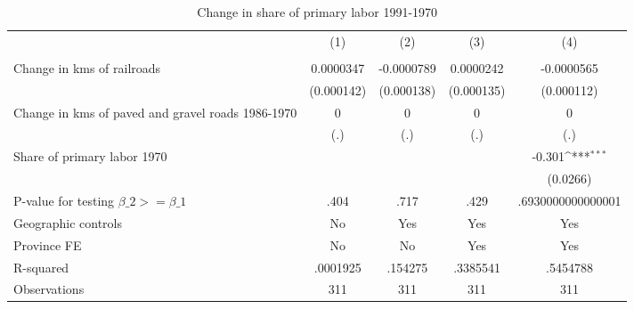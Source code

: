 \begin{table}[htbp]\centering
\def\sym#1{\ifmmode^{#1}\else\(^{#1}\)\fi}
\caption{Change in share of primary labor 1991-1970}
\begin{tabular}{l*{4}{c}}
\hline\hline
                &\multicolumn{1}{c}{(1)}&\multicolumn{1}{c}{(2)}&\multicolumn{1}{c}{(3)}&\multicolumn{1}{c}{(4)}\\
                &\multicolumn{1}{c}{}&\multicolumn{1}{c}{}&\multicolumn{1}{c}{}&\multicolumn{1}{c}{}\\
\hline
Change in kms of railroads&0.0000347         &-0.0000789         &0.0000242         &-0.0000565         \\
                &(0.000142)         &(0.000138)         &(0.000135)         &(0.000112)         \\
[1em]
Change in kms of paved and gravel roads 1986-1970&        0         &        0         &        0         &        0         \\
                &      (.)         &      (.)         &      (.)         &      (.)         \\
[1em]
Share of primary labor 1970&                  &                  &                  &   -0.301\sym{***}\\
                &                  &                  &                  & (0.0266)         \\
\hline
P-value for testing $\beta\_{2} >= \beta\_{1}$&     .404         &     .717         &     .429         &.6930000000000001         \\
Geographic controls&       No         &      Yes         &      Yes         &      Yes         \\
Province FE     &       No         &       No         &      Yes         &      Yes         \\
R-squared       & .0001925         &  .154275         & .3385541         & .5454788         \\
Observations    &      311         &      311         &      311         &      311         \\
\hline\hline
\end{tabular}
\end{table}
